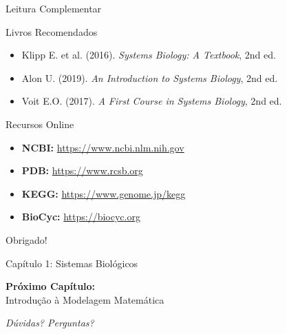 \begin{frame}[allowframebreaks]{Leitura Complementar}
\begin{block}{Livros Recomendados}
\begin{itemize}
    \item Klipp E. et al. (2016). \textit{Systems Biology: A Textbook}, 2nd ed.
    \item Alon U. (2019). \textit{An Introduction to Systems Biology}, 2nd ed.
    \item Voit E.O. (2017). \textit{A First Course in Systems Biology}, 2nd ed.
\end{itemize}
\end{block}

\begin{block}{Recursos Online}
\begin{itemize}
    \item \textbf{NCBI:} \url{https://www.ncbi.nlm.nih.gov}
    \item \textbf{PDB:} \url{https://www.rcsb.org}
    \item \textbf{KEGG:} \url{https://www.genome.jp/kegg}
    \item \textbf{BioCyc:} \url{https://biocyc.org}
\end{itemize}
\end{block}
\end{frame}

\begin{frame}
\begin{center}
{\Huge Obrigado!}

\vspace{1cm}

{\Large Capítulo 1: Sistemas Biológicos}

\vspace{1cm}

\textbf{Próximo Capítulo:}\\
Introdução à Modelagem Matemática

\vspace{1cm}

\textit{Dúvidas? Perguntas?}
\end{center}
\end{frame}


